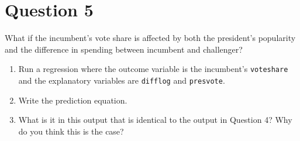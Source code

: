 \documentclass[12pt,letterpaper]{article}
\begin{document}
\section*{Question 5}
\noindent What if the incumbent's vote share is affected by both the president's popularity and the difference in spending between incumbent and challenger? 
	\begin{enumerate}
		\item Run a regression where the outcome variable is the incumbent's \texttt{voteshare} and the explanatory variables are \texttt{difflog} and \texttt{presvote}.	\vspace{5cm}
		\item Write the prediction equation.	\vspace{5cm}
		\item What is it in this output that is identical to the output in Question 4? Why do you think this is the case?
	\end{enumerate}
\end{document}
